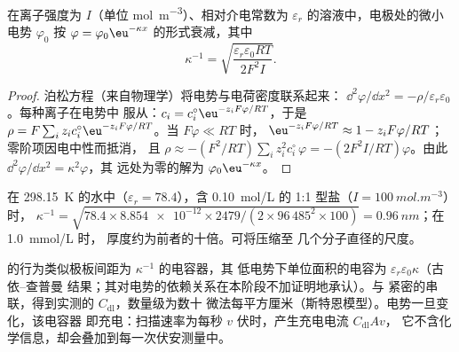 \begin{proposition}[德拜长度]\label{prop:b3:electrode-kinetics:debye-length}
在离子强度为 $I$（单位 \unit{mol.m^{-3}}）、相对介电常数为
$\varepsilon_r$ 的溶液中，电极处的微小电势 $\varphi_0$ 按
$\varphi = \varphi_0\eu^{-\kappa x}$ 的形式衰减，其中
\[
  \kappa^{-1} = \sqrt{\frac{\varepsilon_r\varepsilon_0RT}{2F^2I}} .
\]
\end{proposition}

\begin{proof}
泊松方程（来自物理学）将电势与电荷密度联系起来：
$\dd^2\varphi/\dd x^2 = -\rho/\varepsilon_r\varepsilon_0$。每种离子在电势中
服从：$c_i = c_i^{\circ}\eu^{-z_iF\varphi/RT}$，于是 $\rho = F\sum_iz_ic_i^{\circ}\eu^{-z_iF\varphi/RT}$。当 $F\varphi \ll RT$ 时，
$\eu^{-z_iF\varphi/RT} \approx 1 - z_iF\varphi/RT$；零阶项因电中性而抵消，
且 $\rho \approx -(F^2/RT)\sum_iz_i^2c_i^{\circ}\,\varphi = -(2F^2I/RT)\varphi$。由此 $\dd^2\varphi/\dd x^2 = \kappa^2\varphi$，其
远处为零的解为 $\varphi_0\eu^{-\kappa x}$。
\end{proof}

\begin{example}[双电层的厚度]\label{ex:b3:electrode-kinetics:debye}
在 \qty{298.15}{K} 的水中（$\varepsilon_r = 78.4$），含 \qty{0.10}{mol/L} 的 1:1 型盐（$I = \qty{100}{mol.m^{-3}}$）时，
$\kappa^{-1} = \sqrt{78.4 \times \num{8.854e-12} \times 2479/(2 \times 96\,485^2 \times 100)} = \qty{0.96}{nm}$；在 \qty{1.0}{mmol/L} 时，
厚度约为前者的十倍。可将压缩至
几个分子直径的尺度。
\end{example}

的行为类似极板间距为 $\kappa^{-1}$ 的电容器，其
低电势下单位面积的电容为 $\varepsilon_r\varepsilon_0\kappa$（古依–查普曼
结果；其对电势的依赖关系在本阶段不加证明地承认）。与
紧密的串联，得到实测的 $C_{\mathrm{dl}}$，数量级为数十
微法每平方厘米（斯特恩模型）。电势一旦变化，该电容器
即充电：扫描速率为每秒 $v$ 伏时，产生充电电流 $C_{\mathrm{dl}}Av$，
它不含化学信息，却会叠加到每一次伏安测量中。

